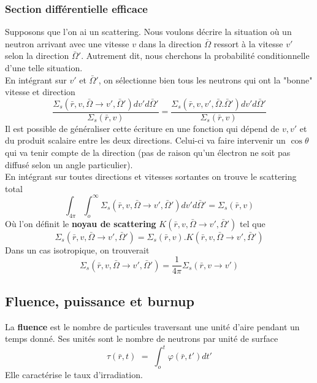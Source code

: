 \subsubsection{Section différentielle efficace}
Supposons que l'on ai un scattering. Nous voulons décrire la situation où un neutron arrivant avec 
une vitesse $v$ dans la direction $\bar\Omega$ ressort à la vitesse $v'$ selon la direction
$\bar\Omega'$. Autrement dit, nous cherchons la probabilité conditionnelle d'une telle situation.\\

En intégrant sur $v'$ et $\bar\Omega'$, on sélectionne bien tous les neutrons qui ont la "bonne" 
vitesse et direction
\begin{equation}
\frac{{{\Sigma _s}(\bar r,v,\bar \Omega  \to v',\bar \Omega ')dv'd\bar \Omega '}}{{{\Sigma _s}(\bar r,v)}} = \frac{{{\Sigma _s}(\bar r,v,v',\bar \Omega .\bar \Omega ')dv'd\bar \Omega '}}{{{\Sigma _s}(\bar r,v)}}
\end{equation}
Il est possible de généraliser cette écriture en une fonction qui dépend de $v,v'$ et du produit
scalaire entre les deux directions. Celui-ci va faire intervenir un $\cos\theta$ qui va tenir 
compte de la direction (pas de raison qu'un électron ne soit pas diffusé selon un angle particulier).\\

En intégrant sur toutes directions et vitesses sortantes on trouve le scattering total
\begin{equation}
\int_{4\pi }   \int_o^\infty    {\Sigma _s}(\bar r,v,\bar \Omega  \to v',\bar \Omega ')dv'd\bar \Omega ' = \Sigma {}_s(\bar r,v)
\end{equation}
Où l'on définit le \textbf{noyau de scattering} $K(\bar r,v,\bar \Omega  \to v',\bar \Omega ')$ tel 
que
\begin{equation}
{\Sigma _s}(\bar r,v,\bar \Omega  \to v',\bar \Omega ') = \Sigma {}_s(\bar r,v).K(\bar r,v,\bar \Omega  \to v',\bar \Omega ')
\end{equation}
Dans un cas isotropique, on trouverait
\begin{equation}
{\Sigma _s}(\bar r,v,\bar \Omega  \to v',\bar \Omega ') = \frac{1}{{4\pi }}\Sigma {}_s(\bar r,v \to v')
\end{equation}



\subsection{Fluence, puissance et burnup}
La \textbf{fluence} est le nombre de particules traversant une unité d'aire pendant un temps donné. 
Ses unités sont le nombre de neutrons par unité de surface
\begin{equation}
\tau (\bar r,t)\,\, = \;\int_o^t \varphi  (\bar r,t')dt'
\end{equation}
Elle caractérise le taux d'irradiation.\\

